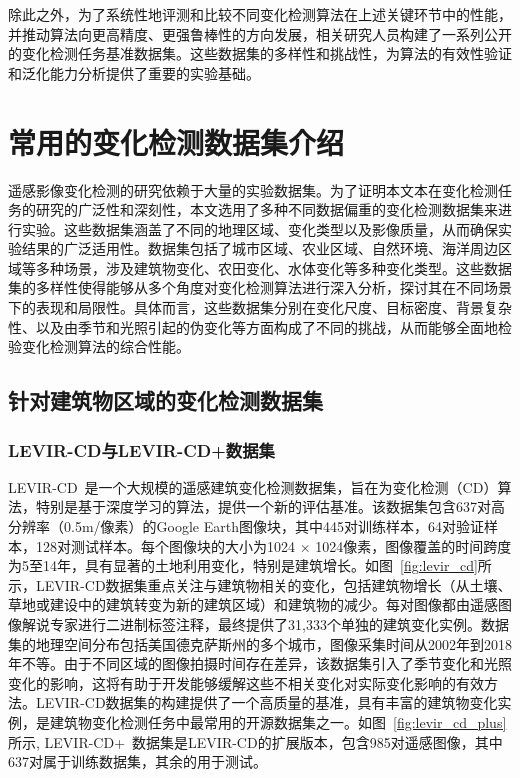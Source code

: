 除此之外，为了系统性地评测和比较不同变化检测算法在上述关键环节中的性能，并推动算法向更高精度、更强鲁棒性的方向发展，相关研究人员构建了一系列公开的变化检测任务基准数据集。这些数据集的多样性和挑战性，为算法的有效性验证和泛化能力分析提供了重要的实验基础。

\section{常用的变化检测数据集介绍}
遥感影像变化检测的研究依赖于大量的实验数据集。为了证明本文本在变化检测任务的研究的广泛性和深刻性，本文选用了多种不同数据偏重的变化检测数据集来进行实验。这些数据集涵盖了不同的地理区域、变化类型以及影像质量，从而确保实验结果的广泛适用性。数据集包括了城市区域、农业区域、自然环境、海洋周边区域等多种场景，涉及建筑物变化、农田变化、水体变化等多种变化类型。这些数据集的多样性使得能够从多个角度对变化检测算法进行深入分析，探讨其在不同场景下的表现和局限性。具体而言，这些数据集分别在变化尺度、目标密度、背景复杂性、以及由季节和光照引起的伪变化等方面构成了不同的挑战，从而能够全面地检验变化检测算法的综合性能。

\subsection{针对建筑物区域的变化检测数据集}
\subsubsection{LEVIR-CD与LEVIR-CD+数据集}
LEVIR-CD~\cite{chen_spatial-temporal_2020}是一个大规模的遥感建筑变化检测数据集，旨在为变化检测（CD）算法，特别是基于深度学习的算法，提供一个新的评估基准。该数据集包含637对高分辨率（0.5m/像素）的Google Earth图像块，其中445对训练样本，64对验证样本，128对测试样本。每个图像块的大小为1024 × 1024像素，图像覆盖的时间跨度为5至14年，具有显著的土地利用变化，特别是建筑增长。如图~\ref{fig:levir_cd}所示，LEVIR-CD数据集重点关注与建筑物相关的变化，包括建筑物增长（从土壤、草地或建设中的建筑转变为新的建筑区域）和建筑物的减少。每对图像都由遥感图像解说专家进行二进制标签注释，最终提供了31,333个单独的建筑变化实例。数据集的地理空间分布包括美国德克萨斯州的多个城市，图像采集时间从2002年到2018年不等。由于不同区域的图像拍摄时间存在差异，该数据集引入了季节变化和光照变化的影响，这将有助于开发能够缓解这些不相关变化对实际变化影响的有效方法。LEVIR-CD数据集的构建提供了一个高质量的基准，具有丰富的建筑物变化实例，是建筑物变化检测任务中最常用的开源数据集之一。如图~\ref{fig:levir_cd_plus}所示, LEVIR-CD+~\cite{chen_spatial-temporal_2020}数据集是LEVIR-CD的扩展版本，包含985对遥感图像，其中637对属于训练数据集，其余的用于测试。

